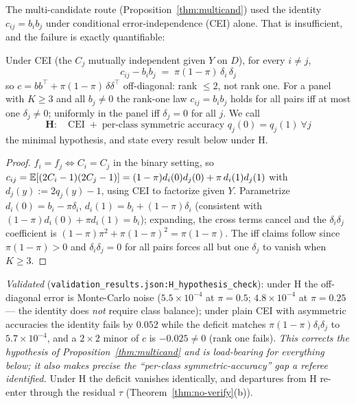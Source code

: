 The multi-candidate route (Proposition~\ref{thm:multicand}) used the identity
$c_{ij}=b_ib_j$ under conditional error-independence (CEI) alone. That is insufficient,
and the failure is exactly quantifiable:

\begin{theorem}\label{thm:H-deficit}
Under CEI (the $C_j$ mutually independent given $Y$ on $D$), for every $i\neq j$,
\[
  \boxed{\;c_{ij}-b_ib_j \;=\; \pi(1-\pi)\,\delta_i\,\delta_j\;}
\]
so $c=bb^\top+\pi(1-\pi)\,\delta\delta^\top$ off-diagonal: rank $\le 2$, not rank one.
For a panel with $K\ge3$ and all $b_j\neq0$ the rank-one law $c_{ij}=b_ib_j$ holds for
all pairs iff at most one $\delta_j\neq0$; uniformly in the panel iff $\delta_j=0$ for
all $j$. We call
\[
  \textbf{H}:\quad \text{CEI} \;+\; \text{per-class symmetric accuracy } q_j(0)=q_j(1)\ \forall j
\]
the minimal hypothesis, and state every result below under H.
\end{theorem}

\begin{proof}
$f_i{=}f_j\iff C_i{=}C_j$ in the binary setting, so
$c_{ij}=\mathbb{E}[(2C_i-1)(2C_j-1)]=(1-\pi)d_i(0)d_j(0)+\pi\,d_i(1)d_j(1)$ with $d_j(y):=2q_j(y)-1$,
using CEI to factorize given $Y$. Parametrize $d_i(0)=b_i-\pi\delta_i$,
$d_i(1)=b_i+(1-\pi)\delta_i$ (consistent with $(1-\pi)d_i(0)+\pi d_i(1)=b_i$); expanding,
the cross terms cancel and the $\delta_i\delta_j$ coefficient is
$(1-\pi)\pi^2+\pi(1-\pi)^2=\pi(1-\pi)$. The iff claims follow since $\pi(1-\pi)>0$ and
$\delta_i\delta_j=0$ for all pairs forces all but one $\delta_j$ to vanish when $K\ge3$.
\end{proof}

\noindent\emph{Validated} (\texttt{validation\_results.json:H\_hypothesis\_check}): under H the
off-diagonal error is Monte-Carlo noise ($5.5\times10^{-4}$ at $\pi{=}0.5$;
$4.8\times10^{-4}$ at $\pi{=}0.25$ --- the identity does \emph{not} require class
balance); under plain CEI with asymmetric accuracies the identity fails by $0.052$ while
the deficit matches $\pi(1-\pi)\delta_i\delta_j$ to $5.7\times10^{-4}$, and a $2\times2$
minor of $c$ is $-0.025\neq0$ (rank one fails). \emph{This corrects the hypothesis of
Proposition~\ref{thm:multicand} and is load-bearing for everything below; it also makes
precise the ``per-class symmetric-accuracy'' gap a referee identified.} Under H the
deficit vanishes identically, and departures from H re-enter through the residual
$\tau$ (Theorem~\ref{thm:no-verify}(b)).


